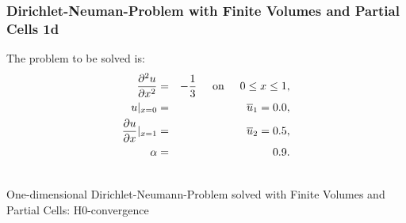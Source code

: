 \documentclass[a4paper,12pt]{article}
\makeatletter
\newenvironment{figurehere}
  {\def\@captype{figure}}
  {}
\makeatother
\begin{document}
\subsubsection{Dirichlet-Neuman-Problem with Finite Volumes and Partial Cells 1d}
The problem to be solved is:
\begin{eqnarray}
\frac{\partial^2 u}{\partial x^2} &=& -\frac{1}{3} \hspace{0.5cm}\text{on}\hspace{0.5cm}0 \leq x\leq 1,\\
u\vert_{x=0} &=& \overline{u}_1 = 0.0,\\
\frac{\partial u}{\partial x}\vert_{x=1} &=& \overline{u}_2 = 0.5,\\
\alpha &=& 0.9.
\end{eqnarray}
\begin{center}
\begin{figurehere}
\\
\caption{One-dimensional Dirichlet-Neumann-Problem solved with Finite Volumes and Partial Cells: H$0$-convergence}\label{fig:fvneumann1dH0}
\end{figurehere}
\end{center}
\end{document}
